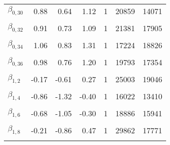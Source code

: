 \begin{table}
\begin{tabular}[t]{lrrrrrr}
$\beta_{0, 30}$ & 0.88 & 0.64 & 1.12 & 1 & 20859 & 14071\\
\cellcolor{gray!6}{$\beta_{0, 31}$} & \cellcolor{gray!6}{0.75} & \cellcolor{gray!6}{0.47} & \cellcolor{gray!6}{1.00} & \cellcolor{gray!6}{1} & \cellcolor{gray!6}{14315} & \cellcolor{gray!6}{10936}\\
$\beta_{0, 32}$ & 0.91 & 0.73 & 1.09 & 1 & 21381 & 17905\\
\cellcolor{gray!6}{$\beta_{0, 33}$} & \cellcolor{gray!6}{1.02} & \cellcolor{gray!6}{0.87} & \cellcolor{gray!6}{1.17} & \cellcolor{gray!6}{1} & \cellcolor{gray!6}{22193} & \cellcolor{gray!6}{17269}\\
$\beta_{0, 34}$ & 1.06 & 0.83 & 1.31 & 1 & 17224 & 18826\\
\cellcolor{gray!6}{$\beta_{0, 35}$} & \cellcolor{gray!6}{0.59} & \cellcolor{gray!6}{0.38} & \cellcolor{gray!6}{0.80} & \cellcolor{gray!6}{1} & \cellcolor{gray!6}{10435} & \cellcolor{gray!6}{11812}\\
$\beta_{0, 36}$ & 0.98 & 0.76 & 1.20 & 1 & 19793 & 17354\\
\cellcolor{gray!6}{$\beta_{1, 1}$} & \cellcolor{gray!6}{-0.13} & \cellcolor{gray!6}{-0.53} & \cellcolor{gray!6}{0.27} & \cellcolor{gray!6}{1} & \cellcolor{gray!6}{26392} & \cellcolor{gray!6}{19957}\\
$\beta_{1, 2}$ & -0.17 & -0.61 & 0.27 & 1 & 25003 & 19046\\
\cellcolor{gray!6}{$\beta_{1, 3}$} & \cellcolor{gray!6}{-0.37} & \cellcolor{gray!6}{-0.85} & \cellcolor{gray!6}{0.11} & \cellcolor{gray!6}{1} & \cellcolor{gray!6}{24411} & \cellcolor{gray!6}{18530}\\
$\beta_{1, 4}$ & -0.86 & -1.32 & -0.40 & 1 & 16022 & 13410\\
\cellcolor{gray!6}{$\beta_{1, 5}$} & \cellcolor{gray!6}{-0.03} & \cellcolor{gray!6}{-0.40} & \cellcolor{gray!6}{0.33} & \cellcolor{gray!6}{1} & \cellcolor{gray!6}{26276} & \cellcolor{gray!6}{19498}\\
$\beta_{1, 6}$ & -0.68 & -1.05 & -0.30 & 1 & 18886 & 15941\\
\cellcolor{gray!6}{$\beta_{1, 7}$} & \cellcolor{gray!6}{0.21} & \cellcolor{gray!6}{-0.15} & \cellcolor{gray!6}{0.58} & \cellcolor{gray!6}{1} & \cellcolor{gray!6}{14237} & \cellcolor{gray!6}{13224}\\
$\beta_{1, 8}$ & -0.21 & -0.86 & 0.47 & 1 & 29862 & 17771\\
\cellcolor{gray!6}{$\beta_{1, 9}$} & \cellcolor{gray!6}{-0.16} & \cellcolor{gray!6}{-0.58} & \cellcolor{gray!6}{0.25} & \cellcolor{gray!6}{1} & \cellcolor{gray!6}{19717} & \cellcolor{gray!6}{14179}\\

\end{tabular}
\end{table}
